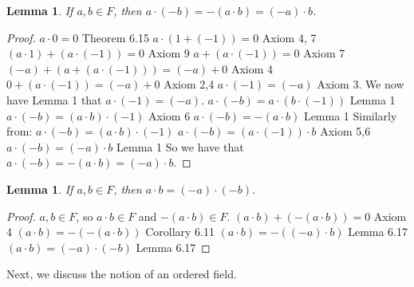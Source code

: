 \documentclass[12pt]{article}
\renewcommand{\_}[1]{\underline{ #1 }}
\newtheorem{lemma}[theorem]{Lemma}
\theoremstyle{definition}
\numberwithin{equation}{subsection}
\begin{document}
\begin{lemma}  If $a, b\in F$, then $a\cdot (-b)=-(a\cdot b)=(-a)\cdot b$.
\end{lemma}

\begin{proof}
$a \cdot 0 = 0$ Theorem 6.15 \newline
$a \cdot (1 + (-1)) = 0$ Axiom 4, 7 \newline
$(a \cdot 1) + (a \cdot (-1)) = 0$ Axiom 9 \newline
$a + (a \cdot (-1)) = 0$ Axiom 7 \newline
$(-a) + (a + (a \cdot (-1))) = (-a) + 0$ Axiom 4 \newline
$0 + (a \cdot (-1)) = (-a) + 0$ Axiom 2,4 \newline
$a \cdot (-1) = (-a)$ Axiom 3. \newline
We now have Lemma 1 that $a \cdot (-1) = (-a)$. \newline
$a \cdot (-b) = a \cdot (b \cdot (-1))$ Lemma 1 \newline
$a \cdot (-b) = (a \cdot b) \cdot (-1)$ Axiom 6 \newline
$a \cdot (-b) = -(a \cdot b)$ Lemma 1 \newline
Similarly from: \newline
$a \cdot (-b) = (a \cdot b) \cdot (-1)$ \newline
$a \cdot (-b) = (a \cdot (-1)) \cdot b$ Axiom 5,6 \newline
$a \cdot (-b) = (-a) \cdot b$ Lemma 1 \newline
So we have that $a \cdot (-b) = -(a \cdot b) = (-a) \cdot b$.
\end{proof}

\begin{lemma}  If $a, b\in F$, then $a\cdot b=(-a)\cdot (-b)$.
\end{lemma}

\begin{proof}
$a,b \in F$, so $a \cdot b \in F$ and $-(a \cdot b) \in F$. \newline
$(a \cdot b) + (-(a \cdot b)) = 0$ Axiom 4 \newline
$(a \cdot b) = -(-(a \cdot b))$ Corollary 6.11 \newline
$(a \cdot b) = -((-a) \cdot b)$ Lemma 6.17 \newline
$(a \cdot b) = (-a) \cdot (-b)$ Lemma 6.17
\end{proof}


Next, we discuss the notion of an ordered field.
\end{document}
